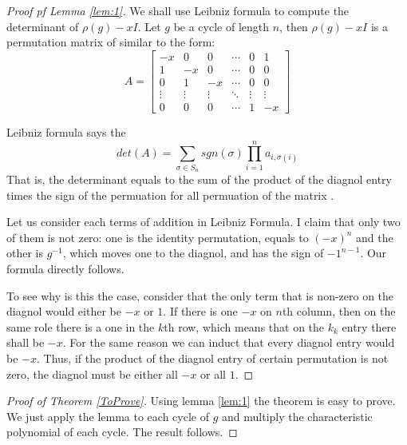 \documentclass[12pt, a4paper]{article}
\theoremstyle{definition}
\theoremstyle{remark}
\begin{document}
\begin{proof}[Proof pf Lemma \ref{lem:1}]
	We shall use Leibniz formula to compute the determinant of $\rho(g)-xI$. Let $g$ be a cycle of length $n$, then $\rho(g) -xI$ is a permutation matrix of similar to the form:
	$$ 
	A=
	\begin{bmatrix}
		-x & 0 & 0 & \cdots & 0 & 1 \\
		1 & -x & 0 & \cdots & 0 & 0 \\
		0 & 1 & -x & \cdots & 0 & 0 \\
		\vdots & \vdots & \vdots & \ddots & \vdots & \vdots \\
		0 & 0 & 0 & \cdots & 1 & -x
	\end{bmatrix}
	$$

	Leibniz formula says the
	\begin{equation}
		det(A) = \sum_{\sigma \in S_n} sgn(\sigma) \prod_{i=1}^{n} a_{i, \sigma(i)}
	\end{equation}
	That is, the determinant equals to the sum of the product of the diagnol entry times the sign of the permuation for all permuation of the matrix .

	Let us consider each terms of addition in Leibniz Formula. I claim that only two of them is not zero: one is the identity permutation, equals to $(-x)^{n}$ and the other is $g^{-1}$, which moves one to the diagnol, and has the sign of $-1^{n-1}$. 
	Our formula directly follows.

	To see why is this the case, consider that the only term that is non-zero on the diagnol would either be $-x$ or $1$. If there is one $-x$ on $n$th column, then on the same role there is a one in the $k$th row, which means that on the $k_k$ entry there shall be $-x$. For the same reason we can induct that every diagnol entry would be $-x$. Thus, if the product of the diagnol entry of certain permutation is not zero, the diagnol must be either all $-x$ or all $1$.
\end{proof}

\begin{proof}[Proof of Theorem \ref{ToProve}]
	Using lemma \ref{lem:1} the theorem is easy to prove. We just apply the lemma to each cycle of $g$ and multiply the characteristic polynomial of each cycle. The result follows.
\end{proof}
\end{document}

